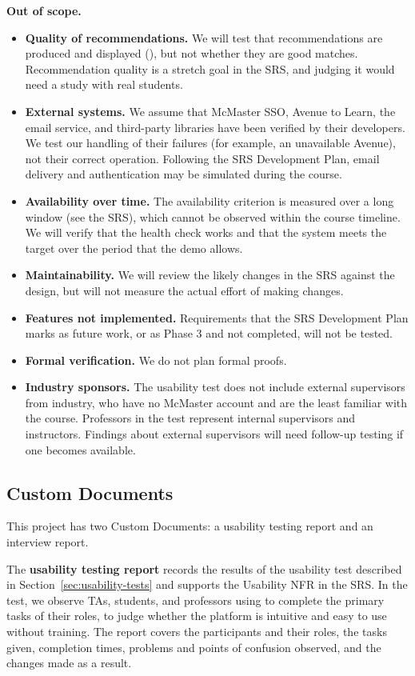 \documentclass[12pt, titlepage]{article}
\providecommand{\descriptiveid}[1]{\texttt{\detokenize{#1}}}
\providecommand{\rref}[1]{\descriptiveid{#1}}
\begin{document}
\textbf{Out of scope.}
\begin{itemize}
  \item \textbf{Quality of recommendations.} We will test that recommendations are produced and displayed (\rref{FR_TeamRecommend}), but not whether they are good matches. Recommendation quality is a stretch goal in the SRS, and judging it would need a study with real students.
  \item \textbf{External systems.} We assume that McMaster SSO, Avenue to Learn, the email service, and third-party libraries have been verified by their developers. We test our handling of their failures (for example, an unavailable Avenue), not their correct operation. Following the SRS Development Plan, email delivery and authentication may be simulated during the course.
  \item \textbf{Availability over time.} The availability criterion is measured over a long window (see the SRS), which cannot be observed within the course timeline. We will verify that the health check works and that the system meets the target over the period that the demo allows.
  \item \textbf{Maintainability.} We will review the likely changes in the SRS against the design, but will not measure the actual effort of making changes.
  \item \textbf{Features not implemented.} Requirements that the SRS Development Plan marks as future work, or as Phase 3 and not completed, will not be tested.
  \item \textbf{Formal verification.} We do not plan formal proofs.
  \item \textbf{Industry sponsors.} The usability test does not include external supervisors from industry, who have no McMaster account and are the least familiar with the course. Professors in the test represent internal supervisors and instructors. Findings about external supervisors will need follow-up testing if one becomes available.
\end{itemize}

\subsection{Custom Documents}

This project has two Custom Documents: a usability testing report and an interview report.

The \textbf{usability testing report} records the results of the usability test described in Section~\ref{sec:usability-tests} and supports the Usability NFR in the SRS. In the test, we observe TAs, students, and professors using \projname{} to complete the primary tasks of their roles, to judge whether the platform is intuitive and easy to use without training. The report covers the participants and their roles, the tasks given, completion times, problems and points of confusion observed, and the changes made as a result.
\end{document}
